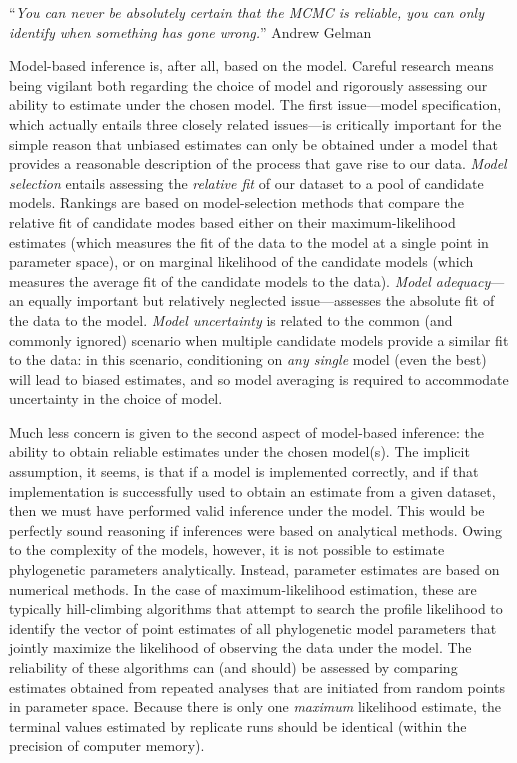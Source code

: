 \documentclass[11pt]{article}
\begin{document}
``{\it You can never be absolutely certain that the MCMC is reliable, you can only identify when something has gone wrong.}'' Andrew Gelman

\bigskip
Model-based inference is, after all, based on the model.
Careful research means being vigilant both regarding the choice of model and rigorously assessing our ability to estimate under the chosen model. The first issue---model specification, which actually entails three closely related issues---is critically important for the simple reason that unbiased estimates can only be obtained under a model that provides a reasonable description of the process that gave rise to our data. {\it Model selection} entails assessing the {\it relative fit} of our dataset to a pool of candidate models. Rankings are based on model-selection methods that compare the relative fit of candidate modes based either on their maximum-likelihood estimates (which measures the fit of the data to the model at a single point in parameter space), or on marginal likelihood of the candidate models (which measures the average fit of the candidate models to the data). {\it Model adequacy}---an equally important but relatively neglected issue---assesses the absolute fit of the data to the model. {\it Model uncertainty} is related to the common (and commonly ignored) scenario when multiple candidate models provide a similar fit to the data: in this scenario, conditioning on {\it any single} model (even the best) will lead to biased estimates, and so model averaging is required to accommodate uncertainty in the choice of model.

Much less concern is given to the second aspect of model-based inference: the ability to obtain reliable estimates under the chosen model(s). The implicit assumption, it seems, is that if a model is implemented correctly, and if that implementation is  successfully used to obtain an estimate from a given dataset, then we must have performed valid inference under the model. This would be perfectly sound reasoning if inferences were based on analytical methods. Owing to the complexity of the models, however, it is not possible to estimate phylogenetic parameters analytically. Instead, parameter estimates are based on numerical methods. In the case of maximum-likelihood estimation, these are typically hill-climbing algorithms that attempt to search the profile likelihood to identify the vector of point estimates of all phylogenetic model parameters that jointly maximize the likelihood of observing the data under the model. The reliability of these algorithms can (and should) be assessed by comparing estimates obtained from repeated analyses that are initiated from random points in parameter space. Because there is only one {\it maximum} likelihood estimate, the terminal values estimated by replicate runs should be identical (within the precision of computer memory).
\end{document}
